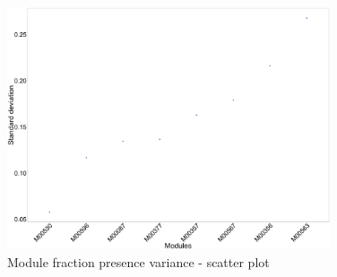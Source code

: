 \documentclass{article}
\begin{document}
\begin{figure}\centering
\includegraphics[width=0.85\textwidth]{module_allOrgs_sd.png}
\caption{Module fraction presence variance - scatter plot}\label{fig:module_allOrgs_sd.png}\end{figure}
\FloatBarrier
\end{document}
